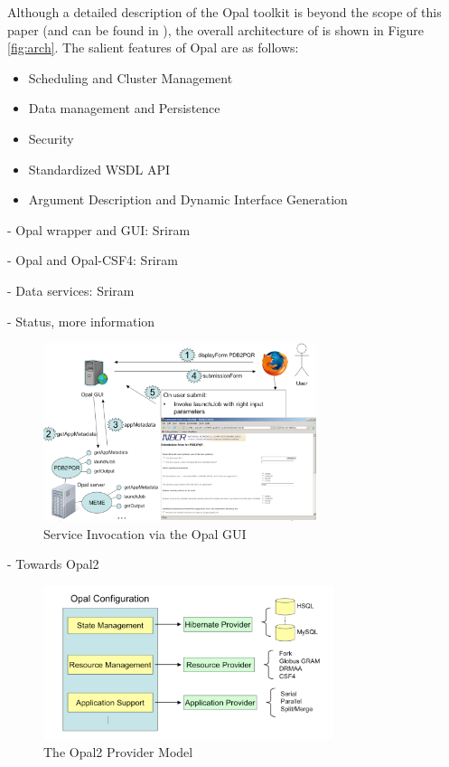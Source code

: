 \documentclass[conference]{IEEEtran}
\begin{document}
Although a detailed description of the Opal toolkit is beyond the scope of
this paper (and can be found in \cite{opal}), the overall architecture of
is shown in Figure \ref{fig:arch}. The salient features of Opal are as
follows:

\begin{itemize}
\item{Scheduling and Cluster Management}
\item{Data management and Persistence}
\item{Security}
\item{Standardized WSDL API}
\item{Argument Description and Dynamic Interface Generation}
\end{itemize}

- Opal wrapper and GUI: Sriram 

- Opal and Opal-CSF4: Sriram

- Data services: Sriram

- Status, more information

\begin{figure}
\begin{center}
\includegraphics[width=8cm]{opal-gui}
\end{center}
\caption{Service Invocation via the Opal GUI}
\label{fig:opal-gui}
\end{figure}

- Towards Opal2

\begin{figure}
\begin{center}
\includegraphics[width=8.5cm]{opal2-providers}
\end{center}
\caption{The Opal2 Provider Model}
\label{fig:opal2-providers}
\end{figure}
\end{document}
